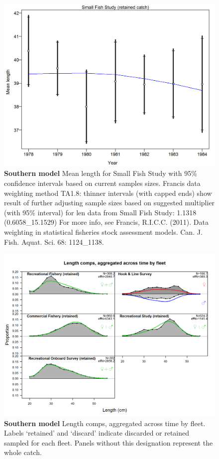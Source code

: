 \documentclass[12pt,]{article}
\begin{document}
\begin{figure}[htbp]
\centering
\includegraphics{./tex2pdf.8516/977aa8ff050e4e1b3c8e7b6ac9fa44f17d8b9ece.png}
\caption{\textbf{Southern model} Mean length for Small Fish Study with
95\% confidence intervals based on current samples sizes. Francis data
weighting method TA1.8: thinner intervals (with capped ends) show result
of further adjusting sample sizes based on suggested multiplier (with
95\% interval) for len data from Small Fish Study: 1.1318
(0.6058\_15.1529) For more info, see Francis, R.I.C.C. (2011). Data
weighting in statistical fisheries stock assessment models. Can. J.
Fish. Aquat. Sci. 68: 1124\_1138.
\label{fig:mod2_20_comp_lenfit_data_weighting_TA1.8_Small Fish Study}}
\end{figure}

\begin{figure}[htbp]
\centering
\includegraphics{./r4ss/plots_mod2/comp_lenfit__aggregated_across_time.png}
\caption{\textbf{Southern model} Length comps, aggregated across time by
fleet. Labels `retained' and `discard' indicate discarded or retained
sampled for each fleet. Panels without this designation represent the
whole catch. \label{fig:mod2_21_comp_lenfit__aggregated_across_time}}
\end{figure}
\end{document}
